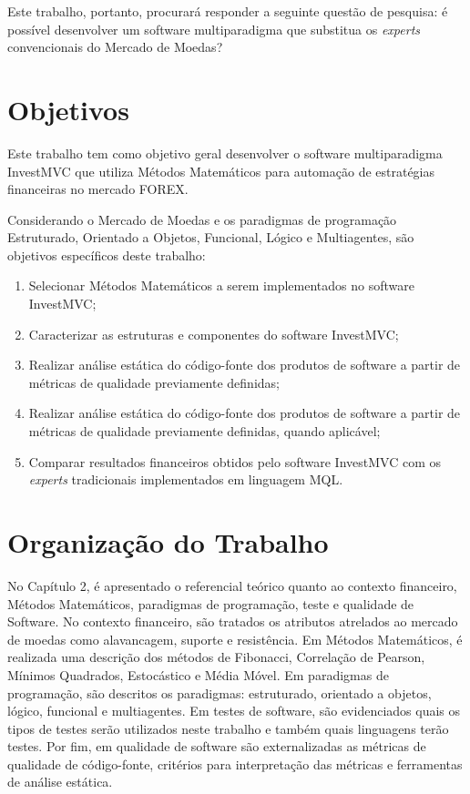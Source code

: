 Este trabalho, portanto, procurará responder a seguinte questão de pesquisa: é possível desenvolver um software multiparadigma que substitua os \textit{experts} convencionais do Mercado de Moedas?

\section{Objetivos}
Este trabalho tem como objetivo geral desenvolver o software multiparadigma InvestMVC que utiliza Métodos Matemáticos para automação de estratégias financeiras no mercado FOREX.

Considerando o Mercado de Moedas e os paradigmas de programação Estruturado, Orientado a Objetos, Funcional, Lógico e Multiagentes, são objetivos específicos deste trabalho:

\begin{enumerate}
\item  Selecionar Métodos Matemáticos a serem implementados no software InvestMVC;

\item Caracterizar as estruturas e componentes do software InvestMVC;

\item Realizar análise estática do código-fonte dos produtos de software a partir de métricas de qualidade previamente definidas;

\item  Realizar análise estática do código-fonte dos produtos de software a partir de métricas de qualidade previamente definidas, quando aplicável;

\item Comparar resultados financeiros obtidos pelo software InvestMVC com os \textit{experts} tradicionais implementados em linguagem MQL.
\end{enumerate}

\section{Organização do Trabalho}
No Capítulo 2, é apresentado o referencial teórico quanto ao contexto financeiro, Métodos Matemáticos, paradigmas de programação, teste e qualidade de Software. No contexto financeiro, são tratados os atributos atrelados ao mercado de moedas como alavancagem, suporte e resistência. Em Métodos Matemáticos, é realizada uma descrição dos métodos de Fibonacci, Correlação de Pearson, Mínimos Quadrados, Estocástico e Média Móvel. Em paradigmas de programação, são descritos os paradigmas: estruturado, orientado a objetos, lógico, funcional e multiagentes. Em testes de software, são evidenciados quais os tipos de testes serão utilizados neste trabalho e também quais linguagens terão testes. Por fim, em qualidade de software são externalizadas as métricas de qualidade de código-fonte, critérios para interpretação das métricas e ferramentas de análise estática.

